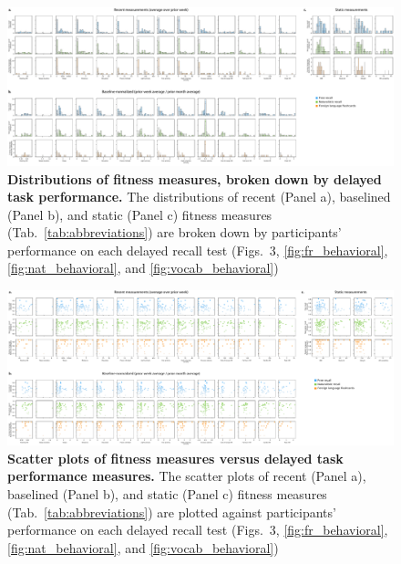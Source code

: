 \documentclass[10pt]{article}
\newcommand{\delayedBehavior}{3}
\begin{document}
\begin{figure}
\centering
\includegraphics[width=\textwidth]{figs/fitness_dists_delayed}
\caption{\textbf{Distributions of fitness measures, broken down
    by delayed task performance.} The distributions of recent
  (Panel a), baselined (Panel b), and static (Panel c) fitness
  measures (Tab.~\ref{tab:abbreviations}) are broken down by
  participants' performance on each delayed recall test
  (Figs.~\delayedBehavior, \ref{fig:fr_behavioral},
  \ref{fig:nat_behavioral}, and \ref{fig:vocab_behavioral})}
\label{fig:fitness_dists_delayed}
\end{figure}

\begin{figure}
\centering
\includegraphics[width=\textwidth]{figs/fitness_scatter_delayed}
\caption{\textbf{Scatter plots of fitness measures versus
    delayed task performance measures.} The scatter plots of recent
  (Panel a), baselined (Panel b), and static (Panel c) fitness
  measures (Tab.~\ref{tab:abbreviations}) are plotted against 
  participants' performance on each delayed recall test
  (Figs.~\delayedBehavior, \ref{fig:fr_behavioral},
  \ref{fig:nat_behavioral}, and \ref{fig:vocab_behavioral})}
\label{fig:fitness_scatters_delayed}
\end{figure}
\end{document}
